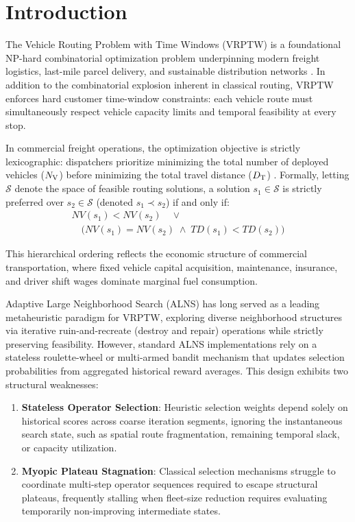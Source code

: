 \section{Introduction}
\label{sec:introduction}

The Vehicle Routing Problem with Time Windows (VRPTW) is a foundational NP-hard combinatorial optimization problem underpinning modern freight logistics, last-mile parcel delivery, and sustainable distribution networks \cite{Dantzig1959, Solomon1987}. In addition to the combinatorial explosion inherent in classical routing, VRPTW enforces hard customer time-window constraints: each vehicle route must simultaneously respect vehicle capacity limits and temporal feasibility at every stop.

In commercial freight operations, the optimization objective is strictly lexicographic: dispatchers prioritize minimizing the total number of deployed vehicles (${N_\mathrm{V}}$) before minimizing the total travel distance (${D_\mathrm{T}}$) \cite{Toth2014, braysy2005vehicle}. Formally, letting $\mathcal{S}$ denote the space of feasible routing solutions, a solution $s_1 \in \mathcal{S}$ is strictly preferred over $s_2 \in \mathcal{S}$ (denoted $s_1 \prec s_2$) if and only if:
\begin{multline}
  NV(s_1) < NV(s_2) \quad \lor \\
  \quad \big(NV(s_1) = NV(s_2) \;\land\; TD(s_1) < TD(s_2)\big)
  \label{eq:lexicographic_intro}
\end{multline}

This hierarchical ordering reflects the economic structure of commercial transportation, where fixed vehicle capital acquisition, maintenance, insurance, and driver shift wages dominate marginal fuel consumption.

Adaptive Large Neighborhood Search (ALNS) \cite{Ropke2006, pisinger2007general} has long served as a leading metaheuristic paradigm for VRPTW, exploring diverse neighborhood structures via iterative ruin-and-recreate (destroy and repair) operations while strictly preserving feasibility. However, standard ALNS implementations rely on a stateless roulette-wheel or multi-armed bandit mechanism that updates selection probabilities from aggregated historical reward averages. This design exhibits two structural weaknesses:
\begin{enumerate}
    \item \textbf{Stateless Operator Selection}: Heuristic selection weights depend solely on historical scores across coarse iteration segments, ignoring the instantaneous search state, such as spatial route fragmentation, remaining temporal slack, or capacity utilization.
    \item \textbf{Myopic Plateau Stagnation}: Classical selection mechanisms struggle to coordinate multi-step operator sequences required to escape structural plateaus, frequently stalling when fleet-size reduction requires evaluating temporarily non-improving intermediate states.
\end{enumerate}

